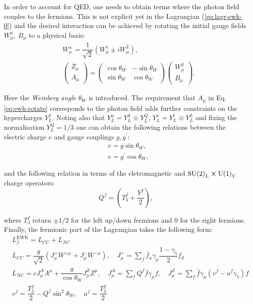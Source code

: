 In order to account for QED, one needs to obtain terms where the photon field couples to the fermions. This is not explicit yet in the Lagrangian (\ref{eq:lagr-ewk-0}) and the desired interaction can be achieved by rotating the initial gauge fields $W^a_\mu, ~B_\mu$ to a physical basis:
\begin{align}\label{eq:ewk-rotate}
    &W^\pm_\mu = \dfrac{1}{\sqrt{2}}(W^1_\mu \pm iW^2_\mu),\\
    &\left(\begin{matrix} Z_\mu \\ A_\mu \end{matrix}\right) = \left(\begin{matrix} \cos\theta_W & -\sin\theta_W \\ \sin\theta_W & \cos\theta_W \end{matrix}\right) \left(\begin{matrix} W^3_\mu \\ B_\mu \end{matrix}\right).
\end{align}

Here the \textit{Weinberg angle} $\theta_W$ is introduced. The requirement that $A_\mu$ in Eq. \ref{eq:ewk-rotate} corresponds to the photon field adds further constraints on the hypercharges $Y_L^f$. Noting also that $Y_L^u = Y_L^d \equiv Y_L^Q$, $Y_L^\nu = Y_L^l \equiv Y_L^L$ and fixing the normalisation $Y_L^Q = 1/3$ one can obtain the following relations between the electric charge $e$ and gauge couplings $g, g^\prime$:
\begin{align}
    &e = g\sin\theta_W,\\
    &e = g^\prime\cos\theta_W,
\end{align}

and the following relation in terms of the eletromagnetic and $\text{SU(2)}_L\cross\text{U(1)}_Y$ charge operators:
\begin{equation}
    Q^f = (T_3^f + \dfrac{Y^f}{2}),
\end{equation}

where $T_3^f$ return $\pm1/2$ for the left up/down fermions and $0$ for the right fermions. Finally, the fermionic part of the Lagrangian takes the following form:
\begin{align}\label{eq:lagr-ewk-1}
    &L_f^\text{EWK} = L_{CC} + L_{NC}\\ 
    &L_{CC} = \dfrac{g}{\sqrt{2}}(J_\mu^+W^{+\mu} + J_\mu^-W^{-\mu}), \quad J_\mu^+ = \sum_f\bar{f}_u\gamma_\mu\dfrac{1-\gamma_5}{2}f_d\\
    &L_{NC} = e J_\mu^A A^\mu + \dfrac{g}{\cos\theta_W}J_\mu^Z Z^\mu, \quad J_\mu^A = \sum_f Q^f \bar{f}\gamma_\mu f, \quad J^Z_\mu = \sum_f \bar{f}\gamma_\mu(v^f - a^f\gamma_5)f\\
    &v^f = \dfrac{T_3^f}{2} - Q^f \sin^2\theta_W, \quad a^f = \dfrac{T_3^f}{2}  
\end{align}


